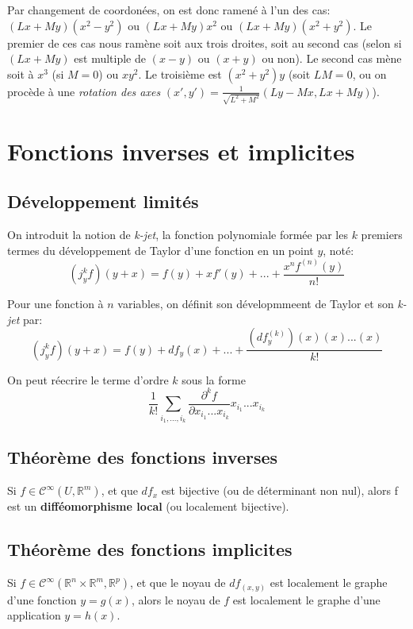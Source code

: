 \documentclass{article}
\begin{document}
Par changement de coordonées, on est donc ramené à l'un des cas: $(Lx+My)(x^2-y^2)$ ou $(Lx+My)x^2$ ou $(Lx+My)(x^2+y^2)$. Le premier de ces cas nous ramène soit aux trois droites, soit au second cas (selon si $(Lx+My)$ est multiple de $(x-y)$ ou $(x+y)$ ou non). Le second cas mène soit à $x^3$ (si $M=0$) ou $xy^2$. Le troisième est $(x^2+y^2)y$ (soit $LM=0$, ou on procède à une \textit{rotation des axes} $(x',y')=\frac{1}{\sqrt{L^2+M^2}}(Ly-Mx,Lx+My)$).

\section{Fonctions inverses et implicites}

\subsection{Développement limités}

On introduit la notion de \textit{k-jet}, la fonction polynomiale formée par les $k$ premiers termes du développement de Taylor d'une fonction en un point $y$, noté: $$(j^k_y f)(y+x) = f(y) + xf'(y)+...+\frac{x^n f^{(n)}(y)}{n!}$$

Pour une fonction à $n$ variables, on définit son dévelopmmeent de Taylor et son \textit{k-jet} par: $$(j^k_y f)(y+x) = f(y) + df_y(x)+...+\frac{(df^{(k)}_y)(x)(x)...(x)}{k!}$$

On peut réecrire le terme d'ordre $k$ sous la forme $$\frac{1}{k!}\sum_{i_1,...,i_k} \frac{\partial^k f}{\partial x_{i_1}...x_{i_k}} x_{i_1}...x_{i_k}$$

\subsection{Théorème des fonctions inverses}

Si $f\in\mathcal{C}^{\infty}(U,\mathbb{R}^m)$, et que $df_x$ est bijective (ou de déterminant non nul), alors f est un \textbf{difféomorphisme local} (ou localement bijective).

\subsection{Théorème des fonctions implicites}

Si $f\in\mathcal{C}^{\infty}(\mathbb{R}^n\times\mathbb{R}^m,\mathbb{R}^p)$, et que le noyau de $df_{(x,y)}$ est localement le graphe d'une fonction $y=g(x)$, alors le noyau de $f$ est localement le graphe d'une application $y=h(x)$.
\end{document}
